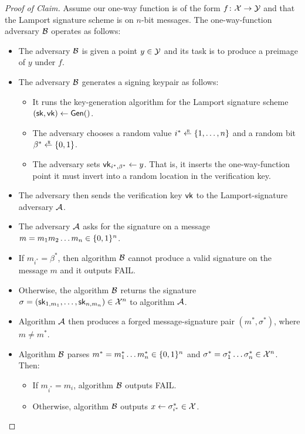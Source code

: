 \begin{proof}[Proof of Claim]
Assume our one-way function is of the form $f \colon \mathcal{X} \to \mathcal{Y}$
and that the Lamport signature scheme is on $n$-bit messages.
The one-way-function adversary $\mathcal{B}$ operates as follows:
\begin{itemize}[noitemsep]
  \item The adversary $\mathcal{B}$ is given a point $y \in \mathcal{Y}$
    and its task is to produce a preimage of $y$ under $f$. 
  \item The adversary $\mathcal{B}$ generates a signing keypair as follows:
    \begin{itemize}[noitemsep]
      \item It runs the key-generation algorithm for the Lamport signature scheme $({\mathsf{sk}}, \mathsf{vk}) \gets \mathsf{Gen}()$.
      \item The adversary chooses a random value $i^* \getsr \{1, \dots, n\}$
            and a random bit $\beta^* \getsr \zo$.
          \item The adversary sets $\mathsf{vk}_{i^*,\beta^*} \gets y$.
            That is, it inserts the one-way-function point it must invert
            into a random location in the verification key.
    \end{itemize}
  \item The adversary then sends the verification key $\mathsf{vk}$ to the Lamport-signature adversary $\mathcal{A}$.
  \item The adversary $\mathcal{A}$ asks for the signature on a message $m = m_1 m_2 \dots m_n \in \{0,1\}^n$.
  \item If $m_{i^*} = \beta^*$, then algorithm $\mathcal{B}$ cannot produce a valid signature on the message
        $m$ and it outputs FAIL.
  \item Otherwise, the algorithm $\mathcal{B}$ returns the signature $\sigma = ({\mathsf{sk}}_{1,m_1}, \dots, {\mathsf{sk}}_{n,m_n}) \in \mathcal{X}^n$
        to algorithm $\mathcal{A}$.
  \item Algorithm $\mathcal{A}$ then produces a forged message-signature pair $(m^*, \sigma^*)$,
        where $m \neq m^*$.
  \item Algorithm $\mathcal{B}$ parses $m^* = m^*_1 \dots m^*_n \in \{0,1\}^n$
        and $\sigma^* = \sigma^*_1 \dots \sigma^*_n \in \mathcal{X}^n$. Then:
        \begin{itemize}[noitemsep]
          \item If $m_{i^*} = m_i$, algorithm $\mathcal{B}$ outputs FAIL.
          \item Otherwise, algorithm $\mathcal{B}$ outputs $x \gets \sigma^*_{i^*} \in \mathcal{X}$.
        \end{itemize}
\end{itemize}


\end{proof}
